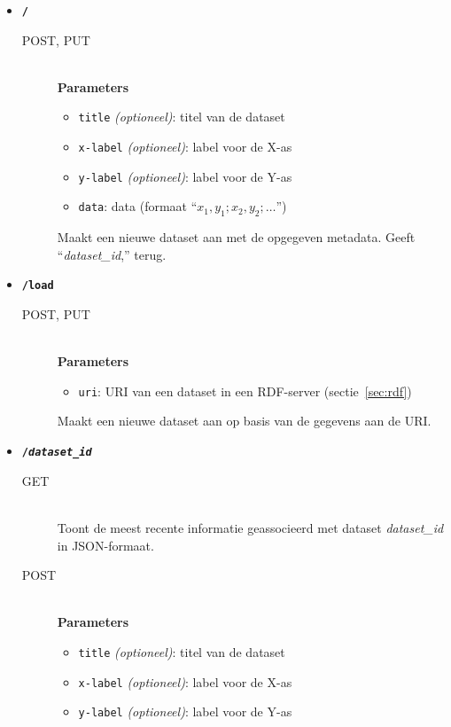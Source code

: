 \documentclass[a4paper]{article}
\begin{document}
\begin{itemize}
  \item {\tt\large\bf /}
    \begin{description}
      \item[POST, PUT] \hfill \\
        {\bf Parameters}
        \begin{itemize}
          \item {\tt title} {\it (optioneel)}: titel van de dataset
          \item {\tt x-label} {\it (optioneel)}: label voor de X-as
          \item {\tt y-label} {\it (optioneel)}: label voor de Y-as
          \item {\tt data}: data (formaat ``$x_1,y_1;x_2,y_2;\ldots$'')
        \end{itemize}
        Maakt een nieuwe dataset aan met de opgegeven metadata. Geeft
        ``{\it dataset\_id},'' terug.
    \end{description}
  \item {\tt\large\bf /load}
    \begin{description}
      \item[POST, PUT] \hfill \\
        {\bf Parameters}
        \begin{itemize}
          \item {\tt uri}: \gls{URI} van een dataset in een \gls{RDF}-server
                (sectie~\ref{sec:rdf})
        \end{itemize}
        Maakt een nieuwe dataset aan op basis van de gegevens aan de \gls{URI}.
    \end{description}
  \item {\tt\large\bf /{\it dataset\_id}}
    \begin{description}
      \item[GET] \hfill \\
        Toont de meest recente informatie geassocieerd met dataset
        {\it dataset\_id} in JSON-formaat.
      \item[POST] \hfill \\
        {\bf Parameters}
        \begin{itemize}
          \item {\tt title} {\it (optioneel)}: titel van de dataset
          \item {\tt x-label} {\it (optioneel)}: label voor de X-as
          \item {\tt y-label} {\it (optioneel)}: label voor de Y-as

\end{itemize}
\end{description}
\end{itemize}
\end{document}
